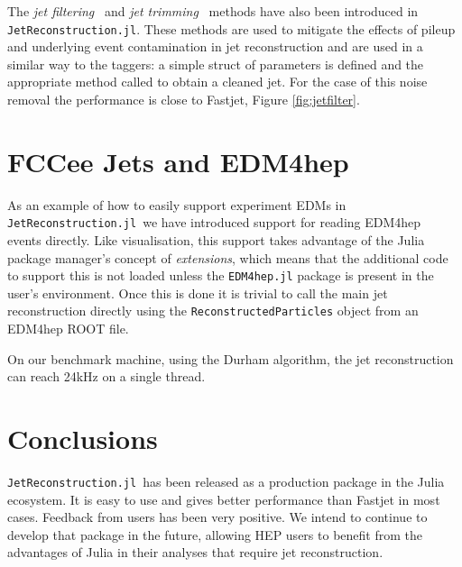 \documentclass{webofc}
\newcommand{\JR}{\texttt{JetReconstruction.jl}}
\begin{document}
\begin{figure}[h]

\end{figure}

The \emph{jet filtering}~\cite{Butterworth_2008} and \emph{jet
trimming}~\cite{Krohn_2010} methods have also been introduced in \JR. These
methods are used to mitigate the effects of pileup and underlying event
contamination in jet reconstruction and are used in a similar way to the
taggers: a simple struct of parameters is defined and the appropriate method
called to obtain a cleaned jet. For the case of this noise removal the
performance is close to Fastjet, Figure \ref{fig:jetfilter}.

\section{FCCee Jets and EDM4hep}
\label{sec:fccee}

As an example of how to easily support experiment EDMs in \JR\ we have
introduced support for reading EDM4hep~\cite{Gaede:2022leb} events directly. Like
visualisation, this support takes advantage of the Julia package manager's
concept of \emph{extensions}, which means that the additional code to support
this is not loaded unless the \texttt{EDM4hep.jl} package is present in the
user's environment. Once this is done it is trivial to call the main jet
reconstruction directly using the \texttt{ReconstructedParticles} object from an
EDM4hep ROOT file.

On our benchmark machine, using the Durham algorithm, the jet reconstruction can
reach 24kHz on a single thread.

\section{Conclusions}
\label{sec:conclusions}

\JR\ has been released as a production package in the Julia ecosystem. It is
easy to use and gives better performance than Fastjet in most cases. Feedback
from users has been very positive. We intend to continue to develop that package
in the future, allowing HEP users to benefit from the advantages of Julia in
their analyses that require jet reconstruction.

\sloppy
\raggedright

\end{document}
